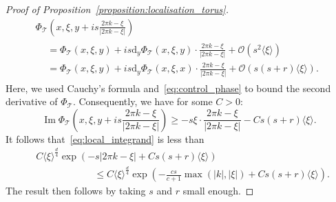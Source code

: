 \documentclass[10pt]{amsart}
\theoremstyle{definition}\newtheorem{defi}[theo]{Definition}\newtheorem{rema}[theo]{Remark}\newtheorem{exam}[theo]{Example}\newtheorem{exem}[theo]{Example}\newtheorem{nota}[theo]{Notation}
\DeclareMathOperator{\im}{Im}
\newcommand{\p}[1]{\left(#1\right)}
\newcommand{\va}[1]{\left|#1\right|}
\newcommand{\brac}[1]{\langle #1 \rangle}
\newcommand{\clO}{\mathcal{O}}
\newcommand{\clT}{\mathcal{T}}
\newcommand{\rmd}{\mathrm{d}}
\begin{document}
\begin{proof}[Proof of Proposition~\ref{proposition:localisation_torus}]
\begin{multline*}
\Phi_{\clT}\left(x,\xi,y + i s \frac{2 \pi k - \xi}{\va{2 \pi k - \xi}}\right) \\
\begin{aligned}
& = \Phi_{\clT}(x,\xi,y) + i s \rmd _y \Phi_{\clT}(x,\xi,y) \cdot \frac{2 \pi k - \xi}{\va{2 \pi k - \xi}} + \clO\p{s^2 \brac{\xi}} \\
& = \Phi_{\clT}(x,\xi,y) + i s \rmd _y \Phi_{\clT}(x,\xi,x) \cdot \frac{2 \pi k - \xi}{\va{2 \pi k - \xi}} + \clO\p{s (s+r) \brac{\xi}}.
\end{aligned}
\end{multline*}
Here, we used Cauchy's formula and~\eqref{eq:control_phase} to bound the second derivative of $\Phi_{\clT}$. Consequently, we have for some $C > 0$:
\begin{equation*}
\im \Phi_{\clT}\left(x,\xi,y + i s \frac{2 \pi k - \xi}{\va{2 \pi k - \xi}}\right) \geq - s \xi \cdot \frac{2 \pi k - \xi}{\va{2 \pi k - \xi}} - C s (s+r) \brac{\xi}.
\end{equation*}
It follows that~\eqref{eq:local_integrand} is less than
\begin{equation*}
\begin{split}
& C \brac{\xi}^{\frac{d}{4}} \exp\p{- s \va{2 \pi k - \xi} + C s (s+r) \brac{\xi}} \\ & \qquad \qquad \qquad \leq C \brac{\xi}^{\frac{d}{4}} \exp\p{ - \frac{cs}{c+1} \max(\va{k}, \va{\xi})+ C s (s+r) \brac{\xi} }.
\end{split}
\end{equation*}
The result then follows by taking $s$ and $r$ small enough.
\end{proof}
\end{document}
